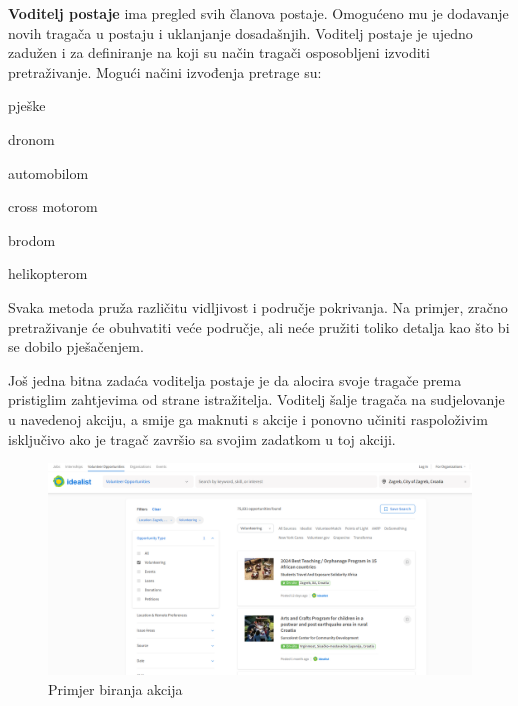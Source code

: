		\textbf{Voditelj postaje} ima pregled svih članova postaje. Omogućeno mu je dodavanje novih tragača u postaju i uklanjanje dosadašnjih. Voditelj postaje je ujedno zadužen i za definiranje na koji su način tragači osposobljeni izvoditi pretraživanje. Mogući načini izvođenja pretrage su:
		
		\begin{packed_item}
			\item pješke
			\item dronom
			\item automobilom
			\item cross motorom
			\item brodom
			\item helikopterom
		\end{packed_item}
		
		Svaka metoda pruža različitu vidljivost i područje pokrivanja. Na primjer, zračno pretraživanje će obuhvatiti veće područje, ali neće pružiti toliko detalja kao što bi se dobilo pješačenjem.
		
		Još jedna bitna zadaća voditelja postaje je da alocira svoje tragače prema pristiglim zahtjevima od strane istražitelja. Voditelj šalje tragača na sudjelovanje u navedenoj akciju, a smije ga maknuti s akcije i ponovno učiniti raspoloživim isključivo ako je tragač završio sa svojim zadatkom u toj akciji.
		
	\begin{figure}[H]
			\includegraphics[scale=0.35]{slike/pr_biranje_akcije.PNG} %
			\centering
			\caption{Primjer biranja akcija}
			\label{fig:promjene}
		\end{figure}
		
